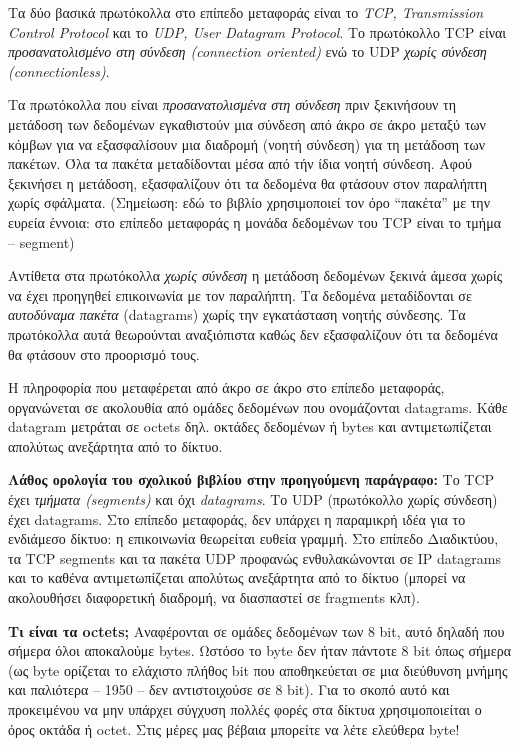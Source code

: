 Τα δύο βασικά πρωτόκολλα στο επίπεδο μεταφοράς είναι το \emph{TCP, Transmission Control Protocol} και το \emph{UDP, User Datagram Protocol}. Το πρωτόκολλο TCP είναι \emph{προσανατολισμένο στη σύνδεση (connection oriented)} ενώ το UDP \emph{χωρίς σύνδεση (connectionless)}.

Τα πρωτόκολλα που είναι \emph{προσανατολισμένα στη σύνδεση} πριν ξεκινήσουν τη μετάδοση των δεδομένων εγκαθιστούν μια σύνδεση από άκρο σε άκρο μεταξύ των κόμβων για να εξασφαλίσουν μια διαδρομή (νοητή σύνδεση) για τη μετάδοση των πακέτων. Όλα τα πακέτα μεταδίδονται μέσα από τήν ίδια νοητή σύνδεση. Αφού ξεκινήσει η μετάδοση, εξασφαλίζουν ότι τα δεδομένα θα φτάσουν στον παραλήπτη χωρίς σφάλματα. (Σημείωση: εδώ το βιβλίο χρησιμοποιεί τον όρο ``πακέτα'' με την ευρεία έννοια: στο επίπεδο μεταφοράς η μονάδα δεδομένων του TCP είναι το τμήμα -- segment)

Αντίθετα στα πρωτόκολλα \emph{χωρίς σύνδεση} η μετάδοση δεδομένων ξεκινά άμεσα χωρίς να έχει προηγηθεί επικοινωνία με τον παραλήπτη. Τα δεδομένα μεταδίδονται σε \emph{αυτοδύναμα πακέτα} (datagrams) χωρίς την εγκατάσταση νοητής σύνδεσης. Τα πρωτόκολλα αυτά θεωρούνται αναξιόπιστα καθώς δεν εξασφαλίζουν ότι τα δεδομένα θα φτάσουν στο προορισμό τους.

Η πληροφορία που μεταφέρεται από άκρο σε άκρο στο επίπεδο μεταφοράς,  οργανώνεται σε ακολουθία από ομάδες δεδομένων που ονομάζονται datagrams. Κάθε datagram μετράται σε octets δηλ. οκτάδες δεδομένων ή bytes και αντιμετωπίζεται απολύτως ανεξάρτητα από το δίκτυο.

\begin{inthebox}
\textbf{Λάθος ορολογία του σχολικού βιβλίου στην προηγούμενη παράγραφο:} Το TCP έχει \emph{τμήματα (segments)} και όχι \emph{datagrams}. Το UDP (πρωτόκολλο χωρίς σύνδεση) έχει datagrams. Στο επίπεδο μεταφοράς,  δεν υπάρχει η παραμικρή ιδέα για το ενδιάμεσο δίκτυο: η επικοινωνία θεωρείται ευθεία γραμμή. Στο επίπεδο Διαδικτύου, τα TCP segments και τα πακέτα UDP προφανώς ενθυλακώνονται σε IP datagrams και το καθένα αντιμετωπίζεται απολύτως ανεξάρτητα από το δίκτυο (μπορεί να ακολουθήσει διαφορετική διαδρομή, να διασπαστεί σε fragments κλπ).\\ 
\end{inthebox}

\textbf{Τι είναι τα octets;} Αναφέρονται σε ομάδες δεδομένων των 8 bit, αυτό δηλαδή που σήμερα όλοι αποκαλούμε bytes. Ωστόσο το byte δεν ήταν πάντοτε 8 bit όπως σήμερα (ως byte ορίζεται το ελάχιστο πλήθος bit που αποθηκεύεται σε μια διεύθυνση μνήμης και παλιότερα -- 1950 -- δεν αντιστοιχούσε σε 8 bit). Για το σκοπό αυτό και προκειμένου να μην υπάρχει σύγχυση πολλές φορές στα δίκτυα χρησιμοποιείται ο όρος οκτάδα ή octet. Στις μέρες μας βέβαια μπορείτε να λέτε ελεύθερα byte! 

 
